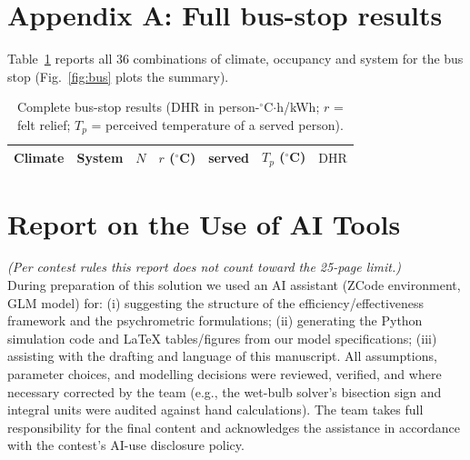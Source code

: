 \documentclass[11pt]{article}
\newcommand{\degrees}{\ensuremath{^\circ}}
\newcommand{\DHR}{\text{DHR}}
\begin{document}
\newpage
\section*{Appendix A: Full bus-stop results}
Table~\ref{tab:busfull} reports all 36 combinations of climate, occupancy and system for the bus stop (Fig.~\ref{fig:bus} plots the summary).
\begin{table}[H]\centering\small
\caption{Complete bus-stop results ($\DHR$ in person-$\degrees$C$\cdot$h/kWh; $r$ = felt relief; $T_p$ = perceived temperature of a served person).}\label{tab:busfull}
\begin{tabular}{@{}llrrrrr@{}}
\toprule
Climate & System & $N$ & $r$ (\degrees C) & served & $T_p$ (\degrees C) & $\DHR$\\
\midrule
\bottomrule
\end{tabular}
\end{table}

\newpage
\section*{Report on the Use of AI Tools}
\textit{(Per contest rules this report does not count toward the 25-page limit.)}\\[4pt]
During preparation of this solution we used an AI assistant (ZCode environment, GLM model) for: (i) suggesting the structure of the efficiency/effectiveness framework and the psychrometric formulations; (ii) generating the Python simulation code and LaTeX tables/figures from our model specifications; (iii) assisting with the drafting and language of this manuscript. All assumptions, parameter choices, and modelling decisions were reviewed, verified, and where necessary corrected by the team (e.g., the wet-bulb solver's bisection sign and integral units were audited against hand calculations). The team takes full responsibility for the final content and acknowledges the assistance in accordance with the contest's AI-use disclosure policy.
\end{document}
